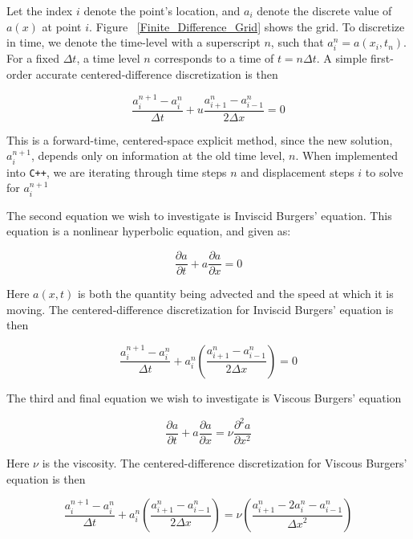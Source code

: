 \documentclass{article}
\begin{document}
Let the index $i$ denote the point's location, and $a_i$ denote the discrete value of $a(x)$ at point $i$. Figure ~\ref{Finite_Difference_Grid} shows the grid. To discretize in time, we denote the time-level with a superscript $n$, such that $a_i^n = a(x_i, t_n)$. For a fixed $\Delta t$, a time level $n$ corresponds to a time of $t = n \Delta t$. A simple first-order accurate centered-difference discretization is then

\begin{equation}
 \frac{a_i^{n+1} - a_i^n}{\Delta t} + u \frac{a_{i+1}^n - a_{i-1}^n}{2 \Delta x}  = 0
\end{equation}

This is a forward-time, centered-space explicit method, since the new solution, $a_i^{n+1}$, depends only on information at the old time level, $n$. When implemented into \texttt{C++}, we are iterating through time steps $n$ and displacement steps $i$ to solve for $a_i^{n+1} $

The second equation we wish to investigate is Inviscid Burgers’ equation. This equation is a nonlinear hyperbolic equation, and given as:

\begin{equation}
 \frac{\partial a}{\partial t} + a \frac{\partial a}{\partial x} = 0
\end{equation}

Here $a(x,t)$ is both the quantity being advected and the speed at which it is moving. The centered-difference discretization for Inviscid Burgers' equation is then

\begin{equation}
 \frac{a_i^{n+1} - a_i^n}{\Delta t} +  a_i^n ( \frac{a_{i+1}^n - a_{i-1}^n}{2 \Delta x} ) = 0
\end{equation}

The third and final equation we wish to investigate is Viscous Burgers' equation

\begin{equation}
 \frac{\partial a}{\partial t} + a \frac{\partial a}{\partial x} = \nu \frac{\partial ^2 a}{\partial x^2} 
\end{equation}

Here $\nu$ is the viscosity. The centered-difference discretization for Viscous Burgers' equation is then

\begin{equation}
 \frac{a_i^{n+1} - a_i^n}{\Delta t} + a_i^n ( \frac{a_{i+1}^n - a_{i-1}^n}{2 \Delta x} ) = \nu (\frac{a_{i+1}^n - 2a_i^n - a_{i-1}^n}{{\Delta x}^2})
\end{equation}
\end{document}
